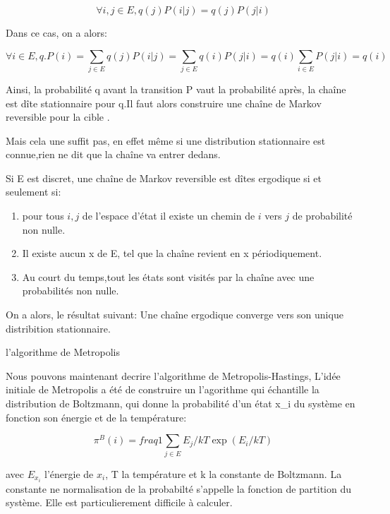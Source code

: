 \begin{equation}
\forall i,j \in E, q(j)P(i|j)=q(j)P(j|i)
\end{equation}

Dans ce cas, on a alors:

\begin{equation}
\forall i \in E, q.P (i) = \sum_{j \in E} q(j)P(i|j) = \sum_{j \in E} q(i)P(j|i) = q(i) \sum_{i \in E}P(j|i) = q(i)
\end{equation}

Ainsi, la probabilité q avant la transition P vaut la probabilité après, la chaîne est dîte stationnaire pour q.Il faut alors construire une chaîne de Markov reversible pour la cible \pi.

Mais cela une suffit pas, en effet même si une distribution stationnaire est connue,rien ne dit que la chaîne va entrer dedans. 

Si E est discret, une chaîne de Markov reversible est dîtes ergodique si et seulement si:

\begin{enumerate}
  \label{crit_ergo}
\item pour tous $i, j$ de l'espace d'état il existe un chemin de   $i$  vers   $j$  de probabilité non nulle. 
\item Il existe aucun x de E, tel que la chaîne revient en x périodiquement.
\item  Au court du temps,tout les états sont visités par la chaîne avec une probabilités non nulle. 
\end{enumerate}

On a alors, le résultat suivant:
Une chaîne ergodique converge vers son unique distribition stationnaire.

l'algorithme de Metropolis

Nous pouvons maintenant decrire l'algorithme de Metropolis-Hastings, L'idée initiale de Metropolis a été de construire un l'agorithme qui échantille la distribution de Boltzmann, qui donne la probabilité d'un état x_i du système en fonction son énergie et de la température:


\begin{equation}
\pi^B(i) = fraq{1}{\sum_{j \in E}E_j/kT} \exp(E_i/kT)
\end{equation}

avec $E_{x_i}$  l'énergie de $x_i$, T la température et k la constante de Boltzmann. La constante ne normalisation de la probabilté s'appelle la fonction de partition du système. Elle est particulierement difficile à calculer.


